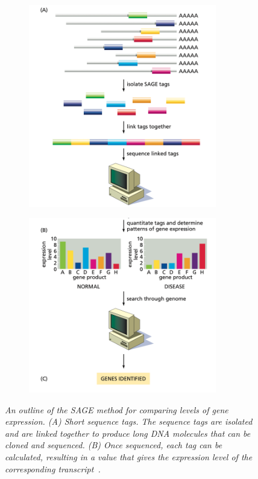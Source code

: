 \documentclass[]{final_report}
\begin{document}
\begin{figure}[!h]
    \centering
    \begin{subfigure}[t]{.45\textwidth}
        \centering
        \includegraphics[width=0.9\textwidth]{SAGE1.png}
        \caption{}
        \label{fig:SAGE1} 
    \end{subfigure}
    \begin{subfigure}[t]{.45\textwidth}
       \centering
       \includegraphics[width=0.9\textwidth]{SAGE2.png}
       \caption{}
       \label{fig:SAGE2}
    \end{subfigure}
    \caption{\emph{An outline of the SAGE method for comparing levels of gene expression. (A) Short sequence tags. The sequence tags are isolated and are linked together to produce long DNA molecules that can be cloned and sequenced. (B) Once sequenced, each tag can be calculated, resulting in a value that gives the expression level of the corresponding transcript~\cite{zvelebil_understanding_2008}.}}\label{fig:SAGE}
\end{figure}
\end{document}
